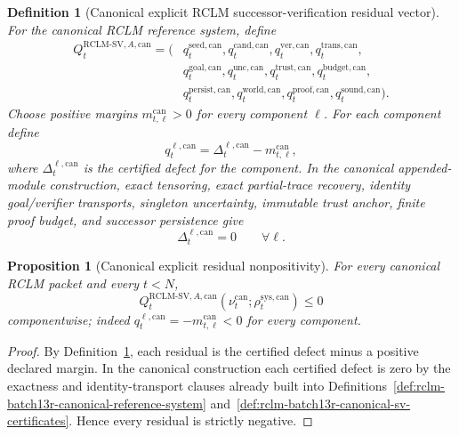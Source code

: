\documentclass[11pt,a4paper]{article}
\newtheorem{proposition}[theorem]{Proposition}
\newtheorem{definition}[theorem]{Definition}
\newcommand{\RCLM}{\mathrm{RCLM}}
\newcommand{\sys}{\mathrm{sys}}
\begin{document}
\begin{definition}[Canonical explicit RCLM successor-verification residual vector]
\label{def:rclm-batch13rA-canonical-explicit-sv-residual-vector}
For the canonical RCLM reference system, define
\[
\begin{aligned}
Q_t^{\RCLM\text{-}\mathrm{SV},A,\mathrm{can}}
=(&q_t^{\mathrm{seed},\mathrm{can}},q_t^{\mathrm{cand},\mathrm{can}},
q_t^{\mathrm{ver},\mathrm{can}},q_t^{\mathrm{trans},\mathrm{can}},\\
&q_t^{\mathrm{goal},\mathrm{can}},q_t^{\mathrm{unc},\mathrm{can}},
q_t^{\mathrm{trust},\mathrm{can}},q_t^{\mathrm{budget},\mathrm{can}},\\
&q_t^{\mathrm{persist},\mathrm{can}},q_t^{\mathrm{world},\mathrm{can}},
q_t^{\mathrm{proof},\mathrm{can}},q_t^{\mathrm{sound},\mathrm{can}}).
\end{aligned}
\]
Choose positive margins \(m_{t,\ell}^{\mathrm{can}}>0\) for every component \(\ell\).  For each component define
\[
q_t^{\ell,\mathrm{can}}
=
\Delta_t^{\ell,\mathrm{can}}-m_{t,\ell}^{\mathrm{can}},
\]
where \(\Delta_t^{\ell,\mathrm{can}}\) is the certified defect for the component.  In the canonical appended-module construction, exact tensoring, exact partial-trace recovery, identity goal/verifier transports, singleton uncertainty, immutable trust anchor, finite proof budget, and successor persistence give
\[
\Delta_t^{\ell,\mathrm{can}}=0
\qquad\forall \ell.
\]
\end{definition}

\begin{proposition}[Canonical explicit residual nonpositivity]
\label{prop:rclm-batch13rA-canonical-residual-nonpositivity}
For every canonical RCLM packet and every \(t<N\),
\[
Q_t^{\RCLM\text{-}\mathrm{SV},A,\mathrm{can}}(\nu_t^{\mathrm{can}};\rho_t^{\sys,\mathrm{can}})\le0
\]
componentwise; indeed \(q_t^{\ell,\mathrm{can}}=-m_{t,\ell}^{\mathrm{can}}<0\) for every component.
\end{proposition}

\begin{proof}
By Definition~\ref{def:rclm-batch13rA-canonical-explicit-sv-residual-vector}, each residual is the certified defect minus a positive declared margin.  In the canonical construction each certified defect is zero by the exactness and identity-transport clauses already built into Definitions~\ref{def:rclm-batch13r-canonical-reference-system} and~\ref{def:rclm-batch13r-canonical-sv-certificates}.  Hence every residual is strictly negative.
\end{proof}
\end{document}
